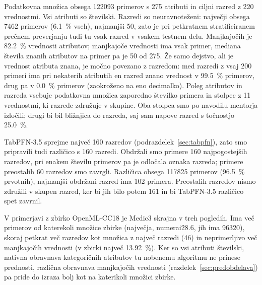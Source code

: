 \documentclass[a4paper,12pt,openright]{book}
\begin{document}
Podatkovna množica obsega \num{122093} primerov s 275 atributi in ciljni
razred z 220 vrednostmi. Vsi atributi so številski. Razredi so neuravnoteženi:
največji obsega 7462 primerov (\SI{6.1}{\percent} vseh), najmanjši 50, zato je
pri petkratnem stratificiranem prečnem preverjanju tudi tu vsak razred v
vsakem testnem delu. Manjkajočih je \SI{82.2}{\percent} vrednosti atributov;
manjkajoče vrednosti ima vsak primer, mediana števila znanih atributov na
primer pa je 50 od 275. Že samo dejstvo, ali je vrednost atributa znana, je
močno povezano z razredom: med razredi z vsaj 200 primeri ima pri nekaterih
atributih en razred znano vrednost v \SI{99.5}{\percent} primerov, drug pa v
\SI{0.0}{\percent} primerov (zaokroženo na eno decimalko). Poleg atributov in razreda vsebuje podatkovna množica zaporedno
številko primera in stolpec z 11 vrednostmi, ki razrede združuje v skupine.
Oba stolpca smo po navodilu mentorja izločili; drugi bi bil bližnjica do
razreda, saj sam napove razred s točnostjo \SI{25.0}{\percent}.

TabPFN-3.5 sprejme največ 160 razredov (podrazdelek~\ref{sec:tabpfn}), zato
smo pripravili tudi različico s 160 razredi. Obdržali smo primere 160
najpogostejših razredov, pri enakem številu primerov pa je odločala oznaka
razreda; primere preostalih 60 razredov smo zavrgli. Različica obsega
\num{117825} primerov (\SI{96.5}{\percent} prvotnih), najmanjši obdržani razred
ima 102 primera. Preostalih razredov nismo združili v skupen razred, ker bi jih
bilo potem 161 in bi TabPFN-3.5 različico spet zavrnil.

V primerjavi z zbirko OpenML-CC18 je Medic3 skrajna v treh pogledih. Ima več
primerov od katerekoli množice zbirke (največja, numerai28.6, jih ima
\num{96320}), skoraj petkrat več razredov kot množica z največ razredi (46) in
neprimerljivo več manjkajočih vrednosti (v zbirki največ \SI{13.92}{\percent}).
Ker so vsi atributi številski, nativna obravnava kategoričnih atributov tu
nobenemu algoritmu ne prinese prednosti, različna obravnava manjkajočih
vrednosti (razdelek~\ref{sec:predobdelava}) pa pride do izraza bolj kot na
katerikoli množici zbirke.
\end{document}
